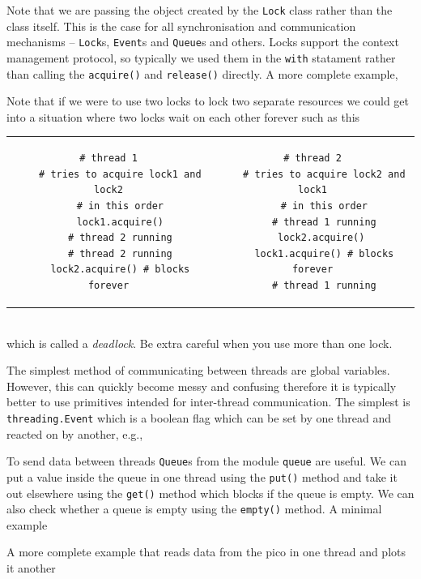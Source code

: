 \documentclass{article}
\newcommand{\ls}[1]{\lstinline{#1}}
\begin{document}
Note that we are passing the object created by the \ls{Lock} class rather than the class itself. This is the case for all synchronisation and communication mechanisms -- \ls{Lock}s, \ls{Event}s and \ls{Queue}s and others. Locks support the context management protocol, so typically we used them in the \ls{with} statament rather than calling the \ls{acquire()} and \ls{release()} directly. A more complete example,


Note that if we were to use two locks to lock two separate resources we could get into a situation where two locks wait on each other forever such as this\\
\begin{tabular}{cc}
\begin{lstlisting}[linewidth=0.5\linewidth]
    # thread 1
    # tries to acquire lock1 and lock2
    # in this order
    lock1.acquire()
    # thread 2 running
    # thread 2 running
    lock2.acquire() # blocks forever
\end{lstlisting}&
\begin{lstlisting}[linewidth=0.5\linewidth]
    # thread 2
    # tries to acquire lock2 and lock1
    # in this order
    # thread 1 running
    lock2.acquire() 
    lock1.acquire() # blocks forever
    # thread 1 running
\end{lstlisting}
\end{tabular}\\
which is called a \emph{deadlock}. Be extra careful when you use more than one lock.

The simplest method of communicating between threads are global variables. However, this can quickly become messy and confusing therefore it is typically better to use primitives intended for inter-thread communication. The simplest is \ls{threading.Event} which is a boolean flag which can be set by one thread and reacted on by another, e.g.,


To send data between threads \ls{Queue}s from the module \ls{queue} are useful. We can put a value inside the queue in one thread using the \ls{put()} method and take it out elsewhere using the \ls{get()} method which blocks if the queue is empty. We can also check whether a queue is empty using the \ls{empty()} method. A minimal example


A more complete example that reads data from the pico in one thread and plots it another

\end{document}
